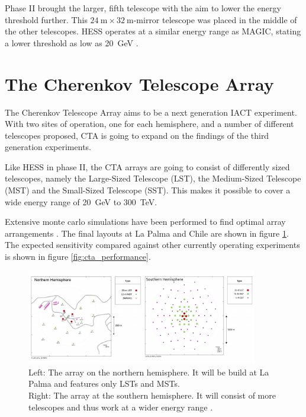 Phase II brought the larger, fifth telescope with the aim to lower the energy threshold
further. This $\SI{24}{\meter} \times \SI{32}{\meter}$-mirror telescope 
was placed in the middle of the other telescopes.
HESS operates at a similar energy range as MAGIC, stating a lower threshold as low as 
\SI{20}{\giga\electronvolt} \cite{vincent2005hess}.


\newpage
\section{The Cherenkov Telescope Array}
\label{sec:cta}

The Cherenkov Telescope Array aims to be a next generation IACT experiment.
With two sites of operation, one for each hemisphere, and a number of different 
telescopes proposed, CTA is going to expand on the findings of the third 
generation experiments.

Like HESS in phase II, the CTA arrays are going to consist of differently sized telescopes, namely
the Large-Sized Telescope (LST), 
the Medium-Sized Telescope (MST) 
and the Small-Sized Telescope (SST).
This makes it possible to cover a wide energy range of \SI{20}{\giga\electronvolt}
to \SI{300}{\tera\electronvolt}.

Extensive monte carlo simulations have been performed to find optimal array arrangements
\cite{BERNLOHR2013171}.
The final layouts at La Palma and Chile are shown in figure
\ref{fig:cta_layout}.
The expected sensitivity compared against other currently operating
experiments is shown in figure \ref{fig:cta_performance}.

\begin{figure}[H]
	\center
	\captionsetup{width=0.9\linewidth}
	\includegraphics[width=0.9\textwidth]{images/cta_layout.png}
	\caption{
	Left: The array on the northern hemisphere. It will be build at La Palma
	and features only LSTs and MSTs. \\
	Right: The array at the southern hemisphere.
	It will consist of more telescopes and thus 
	work at a wider energy range \cite{cta_web}.}
	\label{fig:cta_layout}
\end{figure}

